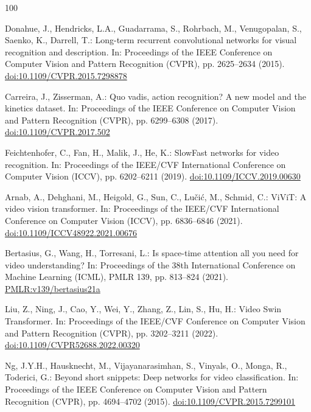 \documentclass[runningheads]{llncs}
\begin{document}
\begin{thebibliography}{100}

Donahue, J., Hendricks, L.A., Guadarrama, S., Rohrbach, M., Venugopalan, S., Saenko, K., Darrell, T.: Long-term recurrent convolutional networks for visual recognition and description. In: Proceedings of the IEEE Conference on Computer Vision and Pattern Recognition (CVPR), pp. 2625--2634 (2015). \href{https://doi.org/10.1109/CVPR.2015.7298878}{doi:10.1109/CVPR.2015.7298878}

Carreira, J., Zisserman, A.: Quo vadis, action recognition? A new model and the kinetics dataset. In: Proceedings of the IEEE Conference on Computer Vision and Pattern Recognition (CVPR), pp. 6299--6308 (2017). \href{https://doi.org/10.1109/CVPR.2017.502}{doi:10.1109/CVPR.2017.502}

Feichtenhofer, C., Fan, H., Malik, J., He, K.: SlowFast networks for video recognition. In: Proceedings of the IEEE/CVF International Conference on Computer Vision (ICCV), pp. 6202--6211 (2019). \href{https://doi.org/10.1109/ICCV.2019.00630}{doi:10.1109/ICCV.2019.00630}

Arnab, A., Dehghani, M., Heigold, G., Sun, C., Lu\v{c}i\'{c}, M., Schmid, C.: ViViT: A video vision transformer. In: Proceedings of the IEEE/CVF International Conference on Computer Vision (ICCV), pp. 6836--6846 (2021). \href{https://doi.org/10.1109/ICCV48922.2021.00676}{doi:10.1109/ICCV48922.2021.00676}

Bertasius, G., Wang, H., Torresani, L.: Is space-time attention all you need for video understanding? In: Proceedings of the 38th International Conference on Machine Learning (ICML), PMLR 139, pp. 813--824 (2021). \href{https://proceedings.mlr.press/v139/bertasius21a.html}{PMLR:v139/bertasius21a}

Liu, Z., Ning, J., Cao, Y., Wei, Y., Zhang, Z., Lin, S., Hu, H.: Video Swin Transformer. In: Proceedings of the IEEE/CVF Conference on Computer Vision and Pattern Recognition (CVPR), pp. 3202--3211 (2022). \href{https://doi.org/10.1109/CVPR52688.2022.00320}{doi:10.1109/CVPR52688.2022.00320}

Ng, J.Y.H., Hausknecht, M., Vijayanarasimhan, S., Vinyals, O., Monga, R., Toderici, G.: Beyond short snippets: Deep networks for video classification. In: Proceedings of the IEEE Conference on Computer Vision and Pattern Recognition (CVPR), pp. 4694--4702 (2015). \href{https://doi.org/10.1109/CVPR.2015.7299101}{doi:10.1109/CVPR.2015.7299101}


\end{thebibliography}
\end{document}
